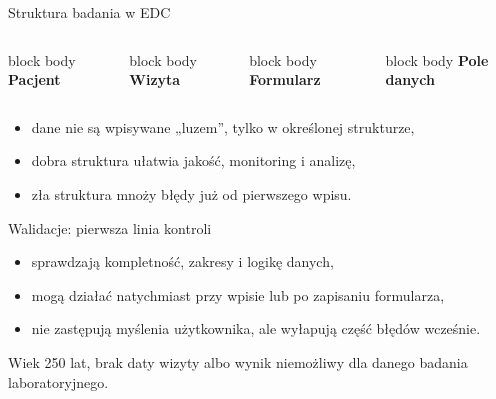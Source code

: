 \begin{frame}{Struktura badania w EDC}
  \begin{columns}[T,onlytextwidth]
    \begin{beamercolorbox}[wd=\linewidth,sep=0.7em,rounded=true]{block body}
      \centering
      \textbf{Pacjent}
    \end{beamercolorbox}

    \begin{beamercolorbox}[wd=\linewidth,sep=0.7em,rounded=true]{block body}
      \centering
      \textbf{Wizyta}
    \end{beamercolorbox}

    \begin{beamercolorbox}[wd=\linewidth,sep=0.7em,rounded=true]{block body}
      \centering
      \textbf{Formularz}
    \end{beamercolorbox}

    \begin{beamercolorbox}[wd=\linewidth,sep=0.7em,rounded=true]{block body}
      \centering
      \textbf{Pole danych}
    \end{beamercolorbox}
  \end{columns}

  \vspace{0.5cm}

  \begin{itemize}
    \item dane nie są wpisywane „luzem”, tylko w określonej strukturze,
    \item dobra struktura ułatwia jakość, monitoring i analizę,
    \item zła struktura mnoży błędy już od pierwszego wpisu.
  \end{itemize}
\end{frame}

\begin{frame}{Walidacje: pierwsza linia kontroli}
  \begin{itemize}
    \item sprawdzają kompletność, zakresy i logikę danych,
    \item mogą działać natychmiast przy wpisie lub po zapisaniu formularza,
    \item nie zastępują myślenia użytkownika, ale wyłapują część błędów wcześnie.
  \end{itemize}

  \vspace{0.3cm}

  \begin{ExampleBox}
    Wiek 250 lat, brak daty wizyty albo wynik niemożliwy dla danego badania laboratoryjnego.
  \end{ExampleBox}
\end{frame}

